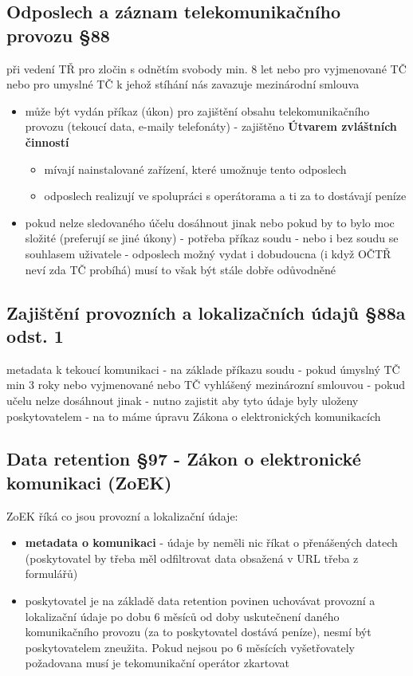 \subsection*{Odposlech a záznam telekomunikačního provozu §88}
při vedení TŘ pro zločin s odnětím svobody min. 8 let nebo pro vyjmenované TČ nebo pro
umyslné TČ k jehož stíhání nás zavazuje mezinárodní smlouva
\begin{itemize}
    \item může být vydán příkaz (úkon) pro zajištění obsahu telekomunikačního provozu (tekoucí data, e-maily telefonáty) - zajištěno \textbf{Útvarem zvláštních činností}
    \begin{itemize}
        \item mívají nainstalované zařízení, které umožnuje tento odposlech
        \item odposlech realizují ve spolupráci s operátorama a ti za to dostávají peníze
    \end{itemize}
    \item pokud nelze sledovaného účelu dosáhnout jinak nebo pokud by to bylo moc složité (preferují se
jiné úkony) - potřeba příkaz soudu - nebo i bez soudu se souhlasem uživatele - odposlech možný
vydat i dobudoucna (i když OČTŘ neví zda TČ probíhá) musí to však být stále dobře odůvodněné
\end{itemize}

\subsection*{Zajištění provozních a lokalizačních údajů §88a odst. 1}
metadata k tekoucí komunikaci - na základe příkazu soudu - pokud úmyslný TČ min 3 roky nebo
vyjmenované nebo TČ vyhlášený mezinározní smlouvou - pokud učelu nelze dosáhnout jinak -
nutno zajistit aby tyto údaje byly uloženy poskytovatelem - na to máme úpravu Zákona o
elektronických komunikacích

\subsection*{Data retention §97 - Zákon o elektronické komunikaci (ZoEK)}
ZoEK říká co jsou provozní a lokalizační údaje:
\begin{itemize}
    \item \textbf{metadata o komunikaci} - údaje by neměli nic říkat o přenášených datech (poskytovatel by třeba měl odfiltrovat data obsažená v URL třeba z formulářů)
    \item  poskytovatel je na základě data retention povinen uchovávat provozní a lokalizační údaje po dobu 6 měsíců od doby uskutečnení daného komunikačního provozu (za to poskytovatel dostává peníze), nesmí být poskytovatelem zneužita. Pokud nejsou po 6 měsících vyšetřovately požadovana musí je tekomunikační operátor zkartovat
\end{itemize}

